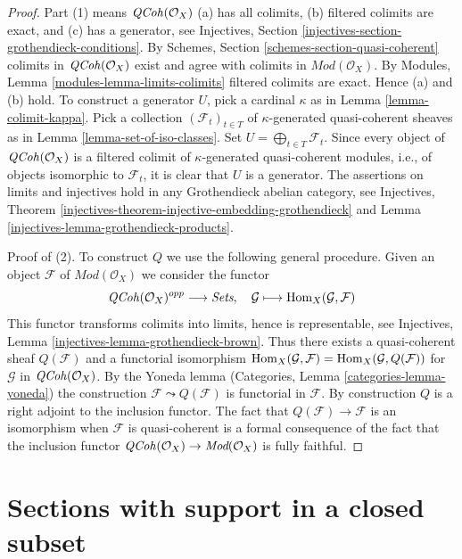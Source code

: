 \begin{proof}
Part (1) means $\mathit{QCoh}(\mathcal{O}_X)$ (a) has all colimits,
(b) filtered colimits are exact, and (c) has a generator, see
Injectives, Section \ref{injectives-section-grothendieck-conditions}.
By Schemes, Section \ref{schemes-section-quasi-coherent}
colimits in $\mathit{QCoh}(\mathcal{O}_X)$ exist and agree
with colimits in $\textit{Mod}(\mathcal{O}_X)$. By
Modules, Lemma \ref{modules-lemma-limits-colimits}
filtered colimits are exact. Hence (a) and (b) hold.
To construct a generator $U$, pick a cardinal $\kappa$ as in
Lemma \ref{lemma-colimit-kappa}. Pick a collection
$(\mathcal{F}_t)_{t \in T}$ of $\kappa$-generated quasi-coherent sheaves as in
Lemma \ref{lemma-set-of-iso-classes}. Set
$U = \bigoplus_{t \in T} \mathcal{F}_t$. Since every object of
$\mathit{QCoh}(\mathcal{O}_X)$ is a filtered colimit of $\kappa$-generated
quasi-coherent modules, i.e., of objects isomorphic to $\mathcal{F}_t$,
it is clear that $U$ is a generator.
The assertions on limits and injectives hold in any
Grothendieck abelian category, see
Injectives, Theorem
\ref{injectives-theorem-injective-embedding-grothendieck} and
Lemma \ref{injectives-lemma-grothendieck-products}.

\medskip\noindent
Proof of (2). To construct $Q$ we use the following general procedure.
Given an object $\mathcal{F}$ of $\textit{Mod}(\mathcal{O}_X)$
we consider the functor
$$
\mathit{QCoh}(\mathcal{O}_X)^{opp} \longrightarrow \textit{Sets},\quad
\mathcal{G} \longmapsto \mathop{\mathrm{Hom}}\nolimits_X(\mathcal{G}, \mathcal{F})
$$
This functor transforms colimits into limits,
hence is representable, see
Injectives, Lemma \ref{injectives-lemma-grothendieck-brown}.
Thus there exists a quasi-coherent sheaf $Q(\mathcal{F})$
and a functorial isomorphism
$\mathop{\mathrm{Hom}}\nolimits_X(\mathcal{G}, \mathcal{F}) = \mathop{\mathrm{Hom}}\nolimits_X(\mathcal{G}, Q(\mathcal{F}))$
for $\mathcal{G}$ in $\mathit{QCoh}(\mathcal{O}_X)$. By the Yoneda lemma
(Categories, Lemma \ref{categories-lemma-yoneda})
the construction $\mathcal{F} \leadsto Q(\mathcal{F})$ is
functorial in $\mathcal{F}$. By construction $Q$ is a right
adjoint to the inclusion functor.
The fact that $Q(\mathcal{F}) \to \mathcal{F}$ is an isomorphism
when $\mathcal{F}$ is quasi-coherent is a formal consequence of the fact
that the inclusion functor
$\mathit{QCoh}(\mathcal{O}_X) \to \textit{Mod}(\mathcal{O}_X)$
is fully faithful.
\end{proof}







\section{Sections with support in a closed subset}
\label{section-sections-with-support-in-closed}

